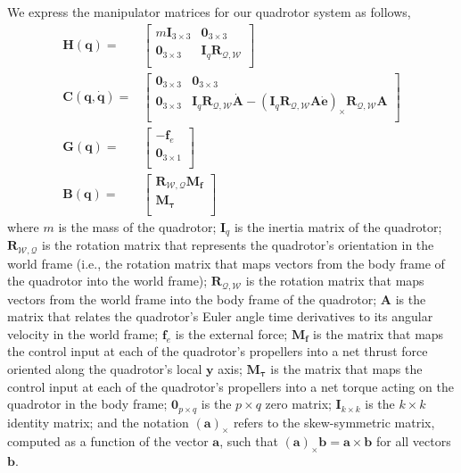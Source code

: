 We express the manipulator matrices for our quadrotor system as follows,
%
\footnotesize
\begin{equation}
\begin{aligned}
\mathbf{H}(\mathbf{q}) = &
\begin{bmatrix}
m\mathbf{I}_{3\times3} & \mathbf{0}_{3\times3} \\
\mathbf{0}_{3\times3}  & \mathbf{I}_{q} \mathbf{R}_{\mathcal{Q},\mathcal{W}} \\
\end{bmatrix} \\
%
\mathbf{C}(\mathbf{q},\dot{\mathbf{q}}) = &
\begin{bmatrix}
\mathbf{0}_{3\times3} & \mathbf{0}_{3\times3}  \\
\mathbf{0}_{3\times3} & \mathbf{I}_q \mathbf{R}_{\mathcal{Q},\mathcal{W}} \dot{\mathbf{A}} - \left(\mathbf{I}_q \mathbf{R}_{\mathcal{Q},\mathcal{W}} \mathbf{A} \dot{\mathbf{e}} \right)_{\times}\mathbf{R}_{\mathcal{Q},\mathcal{W}} \mathbf{A} \\
\end{bmatrix} \\
%
\mathbf{G}(\mathbf{q}) = &
\begin{bmatrix}
-\mathbf{f}_e \\
\mathbf{0}_{3\times1} \\
\end{bmatrix} \\
%
\mathbf{B}(\mathbf{q}) = &
\begin{bmatrix}
\mathbf{R}_{\mathcal{W},\mathcal{Q}} \mathbf{M}_{\mathbf{f}} \\
\mathbf{M}_{\mathbf{\tau}}                                   \\
\end{bmatrix}
\end{aligned}
\end{equation}
%
\normalsize
where $m$ is the mass of the quadrotor;
$\mathbf{I}_q$ is the inertia matrix of the quadrotor;
$\mathbf{R}_{\mathcal{W},\mathcal{Q}}$ is the rotation matrix that represents the quadrotor's orientation in the world frame (i.e., the rotation matrix that maps vectors from the body frame of the quadrotor into the world frame);
$\mathbf{R}_{\mathcal{Q},\mathcal{W}}$ is the rotation matrix that maps vectors from the world frame into the body frame of the quadrotor;
$\mathbf{A}$ is the matrix that relates the quadrotor's Euler angle time derivatives to its angular velocity in the world frame;
$\mathbf{f}_e$ is the external force;
$\mathbf{M}_{\mathbf{f}}$ is the matrix that maps the control input at each of the quadrotor's propellers into a net thrust force oriented along the quadrotor's local $\mathbf{y}$ axis;
$\mathbf{M}_{\mathbf{\tau}}$ is the matrix that maps the control input at each of the quadrotor's propellers into a net torque acting on the quadrotor in the body frame;
$\mathbf{0}_{p \times q}$ is the $p \times q$ zero matrix;
$\mathbf{I}_{k \times k}$ is the $k \times k$ identity matrix;
and the notation $\left( \mathbf{a} \right)_{\times}$ refers to the skew-symmetric matrix, computed as a function of the vector $\mathbf{a}$, such that $\left(\mathbf{a}\right)_{\times}\mathbf{b} = \mathbf{a}\times\mathbf{b}$ for all vectors $\mathbf{b}$.

